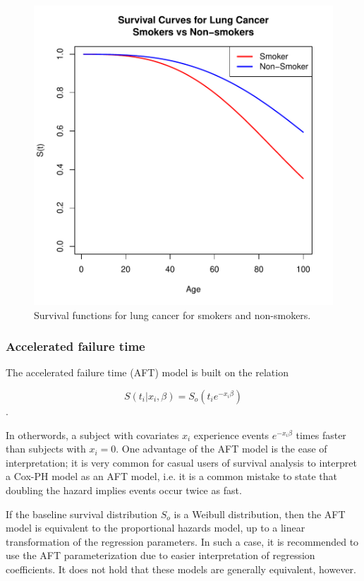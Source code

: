 \documentclass[a4paper]{article}
\begin{document}
\begin{figure}[H]
\begin{center}
\includegraphics{StatisticalBackground-009}
\caption{Survival functions for lung cancer for smokers and non-smokers.}
\label{fig:SmokeSurv}
\end{center}
\end{figure}


    \subsubsection{Accelerated failure time}
   
   The accelerated failure time (AFT) model is built on the relation
   
   \[
   S(t_i | x_i, \beta) = S_o(t_i e^{-x_i \beta})
   \].

    In otherwords, a subject with covariates $x_i$ experience events $e^{-x_i \beta}$ times faster than subjects with $x_i = 0$. One advantage of the AFT model is the ease of interpretation; it is very common for casual users of survival analysis to interpret a Cox-PH model as an AFT model, i.e. it is a common mistake to state that doubling the hazard implies events occur twice as fast. 
    
    If the baseline survival distribution $S_o$ is a Weibull distribution, then the AFT model is equivalent to the proportional hazards model, up to a linear transformation of the regression parameters. In such a case, it is recommended to use the AFT parameterization due to easier interpretation of regression coefficients. It does not hold that these models are generally equivalent, however. 
    
\end{document}
